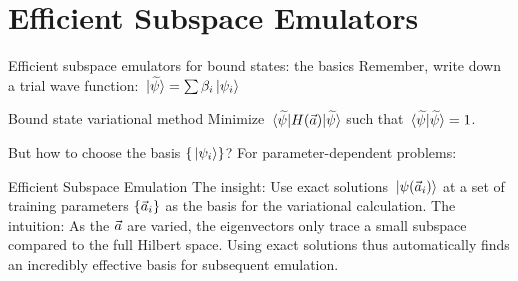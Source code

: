 \documentclass[xcolor=dvipsnames, aspectratio=169]{beamer}
\begin{document}
\section{Efficient Subspace Emulators}


\begin{frame}[t]{Efficient subspace emulators for bound states: the basics}
Remember, write down a \alert{trial wave function}: $\ket*{\widetilde{\psi}} = \sum \beta_i \ket*{\psi_i}$

\begin{myblock}[valign=center]{Bound state variational method}
Minimize $\mel*{\widetilde{\psi}}{H(\vec{a})}{\widetilde{\psi}}$ such that $\braket*{\widetilde{\psi}}{\widetilde{\psi}} = 1$.
\end{myblock}%
\vspace{-0.2cm}%
But how to choose the basis $\{ \ket*{\psi_i} \}$? For parameter-dependent problems:

\begin{myblock}[valign=center]{Efficient Subspace Emulation}
The insight: Use exact solutions $\ket*{\psi(\vec{a}_i)}$ at a set of training parameters $\{\vec{a}_i\}$ as the basis for the variational calculation.
\tcblower
The intuition: As the $\vec{a}$ are varied, the eigenvectors only trace a small subspace compared to the full Hilbert space. Using exact solutions thus automatically finds an \alert{incredibly} effective basis for subsequent emulation.
\end{myblock}

\end{frame}
\end{document}
